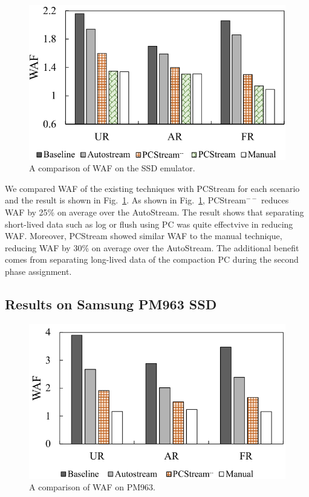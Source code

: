 \begin{figure}[t]
	\centering
	\includegraphics[width=1\linewidth]{figure/result_emul.pdf}
	\vspace{-10pt}
	\caption{A comparison of WAF on the SSD emulator.}
	\label{fig:result_emul}
	\vspace{-15pt}
\end{figure}

We compared WAF of the existing techniques with {\sf PCStream}
for each scenario and the result is shown in Fig.~\ref{fig:result_emul}. 
As shown in Fig.~\ref{fig:result_emul}, 
{\sf PCStream}$^{--}$ reduces WAF by 25\% on average over the AutoStream. 
The result shows that separating short-lived data such as log or flush
using PC was quite effectvive in reducing WAF.
Moreover, {\sf PCStream} showed similar WAF to the manual technique,
reducing WAF by 30\% on average
over the AutoStream.
The additional benefit comes from separating
long-lived data of the compaction PC during the
second phase assignment.

\subsection{Results on Samsung PM963 SSD}
\begin{figure}[t]
	\centering
	\includegraphics[width=1\linewidth]{figure/result_ssd.pdf}
	\vspace{-10pt}
	\caption{A comparison of WAF on PM963.}
	\label{fig:result_SSD}
	\vspace{-15pt}
\end{figure}

